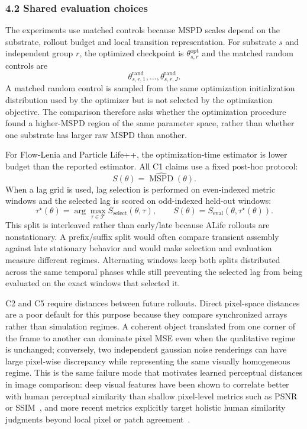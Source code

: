 \subsubsection*{4.2 Shared evaluation choices}
\label{experiments:shared}

The experiments use matched controls because MSPD scales depend on the substrate, rollout budget and local transition representation.  For substrate $s$ and independent group $r$, the optimized checkpoint is $\theta^{\mathrm{opt}}_{s,r}$ and the matched random controls are
\[
  \theta^{\mathrm{rand}}_{s,r,1},\ldots,\theta^{\mathrm{rand}}_{s,r,J}.
\]
A matched random control is sampled from the same optimization initialization distribution used by the optimizer but is not selected by the optimization objective. The comparison therefore asks whether the optimization procedure found a higher-MSPD region of the same parameter space, rather than whether one substrate has larger raw MSPD than another.

For Flow-Lenia and Particle Life++, the optimization-time estimator is lower budget than the reported estimator.  All C1 claims use a fixed post-hoc protocol:
\[
  S(\theta)=\widehat{\operatorname{MSPD}}(\theta).
\]
When a lag grid is used, lag selection is performed on even-indexed metric windows and the selected lag is scored on odd-indexed held-out windows:
\[
  \tau^\star(\theta)=\arg\max_{\tau\in\mathcal T}S_{\mathrm{select}}(\theta,\tau),
  \qquad
  S(\theta)=S_{\mathrm{eval}}(\theta,\tau^\star(\theta)).
\]
This split is interleaved rather than early/late because ALife rollouts are nonstationary.  A prefix/suffix split would often compare transient assembly against late stationary behavior and would make selection and evaluation measure different regimes.  Alternating windows keep both splits distributed across the same temporal phases while still preventing the selected lag from being evaluated on the exact windows that selected it.

C2 and C5 require distances between future rollouts. Direct pixel-space distances are a poor default for this purpose because they compare synchronized arrays rather than simulation regimes.  A coherent object translated from one corner of the frame to another can dominate pixel MSE even when the qualitative regime is unchanged; conversely, two independent gaussian noise renderings can have large pixel-wise discrepancy while representing the same visually homogeneous regime.  This is the same failure mode that motivates learned perceptual distances in image comparison: deep visual features have been shown to correlate better with human perceptual similarity than shallow pixel-level metrics such as PSNR or SSIM~\cite{zhang2018perceptual}, and more recent metrics explicitly target holistic human similarity judgments beyond local pixel or patch agreement~\cite{fu2023dreamsim}.

